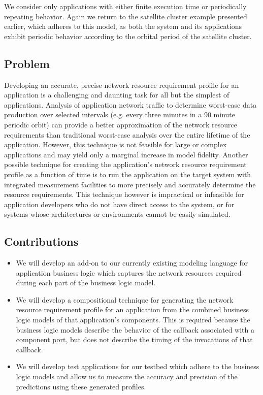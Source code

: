 We consider only applications with either finite execution time or
periodically repeating behavior.  Again we return to the satellite
cluster example presented earlier, which adheres to this model, as
both the system and its applications exhibit periodic behavior
according to the orbital period of the satellite cluster.

\subsection{Problem}
Developing an accurate, precise network resource requirement profile
for an application is a challenging and daunting task for all but the
simplest of applications.  Analysis of application network traffic to
determine worst-case data production over selected intervals
(e.g. every three minutes in a 90 minute periodic orbit) can provide a
better approximation of the network resource requirements than
traditional worst-case analysis over the entire lifetime of the
application.  However, this technique is not feasible for large or
complex applications and may yield only a marginal increase in model
fidelity.  Another possible technique for creating the application's
network resource requirement profile as a function of time is to run
the application on the target system with integrated measurement
facilities to more precisely and accurately determine the resource
requirements.  This technique however is impractical or infeasible for
application developers who do not have direct access to the system, or
for systems whose architectures or environments cannot be easily
simulated.

\subsection{Contributions}
\begin{itemize}
	\item We will develop an add-on to our currently existing
          modeling language for application business logic which
          captures the network resources required during each part of
          the business logic model.
	\item We will develop a compositional technique for generating
          the network resource requirement profile for an application
          from the combined business logic models of that
          application's components.  This is required because the
          business logic models describe the behavior of the callback
          associated with a component port, but does not describe the
          timing of the invocations of that callback.
	\item We will develop test applications for our testbed which
          adhere to the business logic models and allow us to measure
          the accuracy and precision of the predictions using these
          generated profiles.
\end{itemize}

